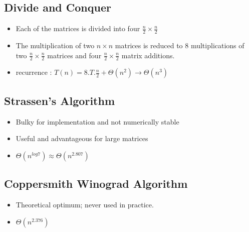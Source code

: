 \documentclass[11pt, letterpaper, oneside]{article}
\begin{document}
\subsection{Divide and Conquer}

	\begin{itemize}
	
        \item Each of the matrices is divided into four $\frac{n}{2} \times \frac{n}{2}$
	\item The multiplication of two $ n \times  n $ matrices is reduced to 8 multiplications of 
	two $\frac{n}{2} \times \frac{n}{2}$ matrices and four $\frac{n}{2} \times \frac{n}{2}$ matrix additions.
	\item recurrence : $T(n) = 8.T. \frac{n}{2} + \Theta(n^2) \rightarrow \Theta(n^3)$ \\
	\end{itemize}

\subsection{Strassen's Algorithm}

	\begin{itemize}
	
        \item Bulky for implementation and not numerically stable
        \item Useful and advantageous for large matrices
	\item $ \Theta(n^{log7}) \approx \Theta(n^{2.807})$ \\
	\end{itemize}

\subsection{Coppersmith Winograd Algorithm}

	\begin{itemize}
	
        \item Theoretical optimum; never used in practice.
	\item $ \Theta(n^{2.376}) $ \\
	\end{itemize}

	
\end{document}
